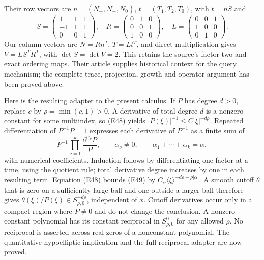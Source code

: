 \documentclass[
  11pt,
]{article}
\begin{document}
Their row vectors are \(n=(N_+,N_-,N_0)\), \(t=(T_1,T_2,T_0)\), with
\(t=nS\) and \[
S=\begin{pmatrix}1&1&1\\-1&1&1\\0&0&1\end{pmatrix},
\quad R=\begin{pmatrix}0&1&0\\0&0&1\\1&0&0\end{pmatrix},
\quad L=\begin{pmatrix}0&0&1\\1&0&0\\0&1&0\end{pmatrix}.
\tag{HP42}
\] Our column vectors are \(N=Rn^T\), \(T=Lt^T\), and direct
multiplication gives \(V=LS^TR^T\), with \(\det S=\det V=2\). This
retains the source's factor two and exact ordering maps. Their article
supplies historical context for the query mechanism; the complete trace,
projection, growth and operator argument has been proved above.

Here is the resulting adapter to the present calculus. If \(P\) has
degree \(d>0\), replace \(c\) by \(\rho=\min(c,1)>0\). A derivative of
total degree \(d\) is a nonzero constant for some multiindex, so (E48)
yields \(|P(\xi)|^{-1}\leq C|\xi|^{-d\rho}\). Repeated differentiation
of \(P^{-1}P=1\) expresses each derivative of \(P^{-1}\) as a finite sum
of \[
P^{-1}\prod_{\nu=1}^k
\frac{\partial^{\alpha_\nu}P}{P},
\qquad \alpha_\nu\ne0,\qquad
\alpha_1+\cdots+\alpha_k=\alpha,
\tag{E49}
\] with numerical coefficients. Induction follows by differentiating one
factor at a time, using the quotient rule; total derivative degree
increases by one in each resulting term. Equation (E48) bounds (E49) by
\(C_\alpha\langle\xi\rangle^{-d\rho-\rho|\alpha|}\). A smooth cutoff
\(\theta\) that is zero on a sufficiently large ball and one outside a
larger ball therefore gives
\(\theta(\xi)/P(\xi)\in S^{-d\rho}_{\rho,0}\), independent of \(x\).
Cutoff derivatives occur only in a compact region where \(P\ne0\) and do
not change the conclusion. A nonzero constant polynomial has its
constant reciprocal in \(S^0_{\rho,0}\) for any allowed \(\rho\). No
reciprocal is asserted across real zeros of a nonconstant polynomial.
The quantitative hypoelliptic implication and the full reciprocal
adapter are now proved.
\end{document}
